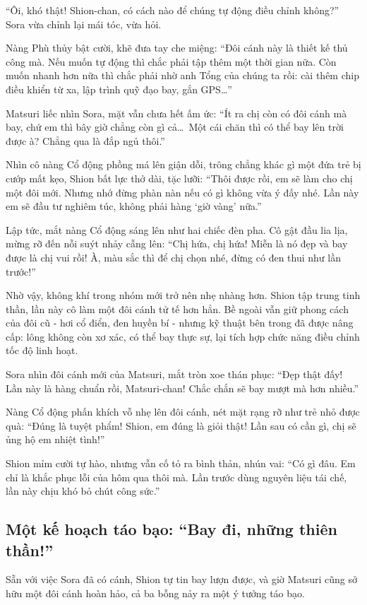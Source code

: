 \documentclass[../main.tex]{subfiles}
\begin{document}
``Ôi, khó thật! Shion-chan, có cách nào để chúng tự động điều chỉnh không?'' Sora vừa chỉnh lại mái tóc, vừa hỏi.

Nàng Phù thủy bật cười, khẽ đưa tay che miệng: ``Đôi cánh này là thiết kế thủ công mà. Nếu muốn tự động thì chắc phải tập thêm một thời gian nữa. Còn muốn nhanh hơn nữa thì chắc phải nhờ anh Tổng của chúng ta rồi:  cài thêm chip điều khiển từ xa, lập trình quỹ đạo bay, gắn GPS\dots''

Matsuri liếc nhìn Sora, mặt vẫn chưa hết ấm ức: ``Ít ra chị còn có đôi cánh mà bay, chứ em thì bây giờ chẳng còn gì cả\dots\ Một cái chăn thì có thể bay lên trời được à? Chẳng qua là đắp ngủ thôi.''

Nhìn cô nàng Cổ động phồng má lên giận dỗi, trông chẳng khác gì một đứa trẻ bị cướp mất kẹo, Shion bất lực thở dài, tặc lưỡi: ``Thôi được rồi, em sẽ làm cho chị một đôi mới. Nhưng nhớ đừng phàn nàn nếu có gì không vừa ý đấy nhé. Lần này em sẽ đầu tư nghiêm túc, không phải hàng `giờ vàng' nữa.''

Lập tức, mắt nàng Cổ động sáng lên như hai chiếc đèn pha. Cô gật đầu lia lịa, mừng rỡ đến nỗi suýt nhảy cẫng lên: ``Chị hứa, chị hứa! Miễn là nó đẹp và bay được là chị vui rồi! À, màu sắc thì để chị chọn nhé, đừng có đen thui như lần trước!''

Nhờ vậy, không khí trong nhóm mới trở nên nhẹ nhàng hơn. Shion tập trung tinh thần, lần này cô làm một đôi cánh tử tế hơn hẳn. Bề ngoài vẫn giữ phong cách của đôi cũ - hơi cổ điển, đen huyền bí - nhưng kỹ thuật bên trong đã được nâng cấp: lông không còn xơ xác, có thể bay thực sự, lại tích hợp chức năng điều chỉnh tốc độ linh hoạt.

Sora nhìn đôi cánh mới của Matsuri, mắt tròn xoe thán phục: ``Đẹp thật đấy! Lần này là hàng chuẩn rồi, Matsuri-chan! Chắc chắn sẽ bay mượt mà hơn nhiều.''

Nàng Cổ động phấn khích vỗ nhẹ lên đôi cánh, nét mặt rạng rỡ như trẻ nhỏ được quà: ``Đúng là tuyệt phẩm! Shion, em đúng là giỏi thật! Lần sau có cần gì, chị sẽ ủng hộ em nhiệt tình!''

Shion mỉm cười tự hào, nhưng vẫn cố tỏ ra bình thản, nhún vai: ``Có gì đâu. Em chỉ là khắc phục lỗi của hôm qua thôi mà. Lần trước dùng nguyên liệu tái chế, lần này chịu khó bỏ chút công sức.''

\subsection*{Một kế hoạch táo bạo: ``Bay đi, những thiên thần!''}
Sẵn với việc Sora đã có cánh, Shion tự tin bay lượn được, và giờ Matsuri cũng sở hữu một đôi cánh hoàn hảo, cả ba bỗng nảy ra một ý tưởng táo bạo.
\end{document}
